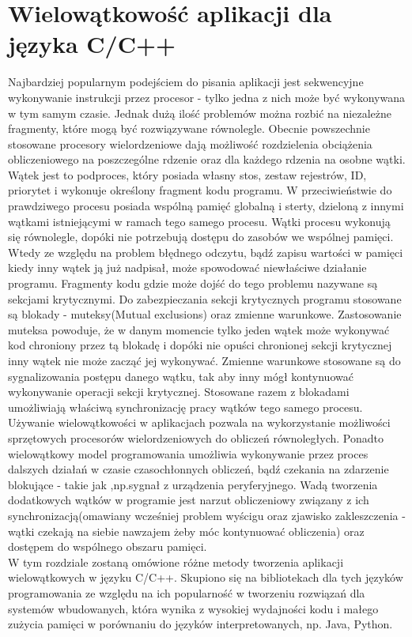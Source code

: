 \documentclass[document.tex]{subfiles}
\begin{document}
\section{Wielowątkowość aplikacji dla języka C/C++}
\indent Najbardziej popularnym podejściem do pisania aplikacji jest sekwencyjne wykonywanie
instrukcji przez procesor - tylko jedna z nich może być wykonywana w tym samym czasie.
Jednak dużą ilość problemów można rozbić na niezależne fragmenty,
które mogą być rozwiązywane równolegle. Obecnie powszechnie stosowane procesory wielordzeniowe dają możliwość rozdzielenia obciążenia obliczeniowego na poszczególne rdzenie oraz dla każdego rdzenia na osobne wątki.\cite{Computer_Architecture_Patterson_Hennesy}\cite{Parallel_computing_article} \\
 \indent Wątek jest to podproces, który posiada własny stos, zestaw rejestrów, ID, priorytet i wykonuje określony fragment kodu programu. 
 W przeciwieństwie do prawdziwego procesu posiada wspólną pamięć globalną i sterty, dzieloną z innymi wątkami istniejącymi w ramach tego samego procesu. 
 Wątki procesu wykonują się równolegle, dopóki nie potrzebują dostępu do zasobów we wspólnej pamięci.\cite{POSIX_article}\cite{POSIX_tutorial} 
 Wtedy ze względu na problem błędnego odczytu, bądź zapisu wartości w pamięci kiedy inny wątek ją już nadpisał, może spowodować niewłaściwe działanie programu. 
 Fragmenty kodu gdzie może dojść do tego problemu nazywane są sekcjami krytycznymi. Do zabezpieczania sekcji krytycznych programu stosowane są blokady - muteksy(Mutual exclusions) oraz zmienne warunkowe.
 Zastosowanie muteksa powoduje, że w danym momencie tylko jeden wątek może wykonywać kod chroniony przez tą blokadę i dopóki nie opuści chronionej sekcji krytycznej inny wątek nie może zacząć jej wykonywać. 
 Zmienne warunkowe stosowane są do sygnalizowania postępu danego wątku, tak aby inny mógł kontynuować wykonywanie operacji sekcji krytycznej. 
 Stosowane razem z blokadami umożliwiają właściwą synchronizację pracy wątków tego samego procesu.
\cite{POSIX_Butenhof}\cite{C++_Stroustrup} \\
\indent Używanie wielowątkowości w aplikacjach pozwala na wykorzystanie możliwości sprzętowych procesorów wielordzeniowych do obliczeń równoległych.
Ponadto wielowątkowy model programowania umożliwia wykonywanie przez proces dalszych działań w czasie czasochłonnych obliczeń, bądź czekania na zdarzenie blokujące - takie jak ,np.sygnał z urządzenia peryferyjnego.
Wadą tworzenia dodatkowych wątków w programie jest narzut obliczeniowy
związany z ich synchronizacją(omawiany wcześniej problem wyścigu oraz zjawisko zakleszczenia - wątki czekają na siebie nawzajem żeby móc kontynuować obliczenia) oraz dostępem do wspólnego obszaru pamięci.\cite{POSIX_Butenhof}\cite{C++_Stroustrup} \\
\indent W tym rozdziale zostaną omówione różne metody tworzenia aplikacji
wielowątkowych w języku C/C++. Skupiono się na bibliotekach dla tych języków
programowania ze względu na ich popularność w tworzeniu rozwiązań dla systemów wbudowanych, która wynika z wysokiej wydajności kodu i małego zużycia pamięci w porównaniu do języków interpretowanych, np. Java, Python.\cite{C++_Stroustrup}\cite{C_King}
\end{document}
